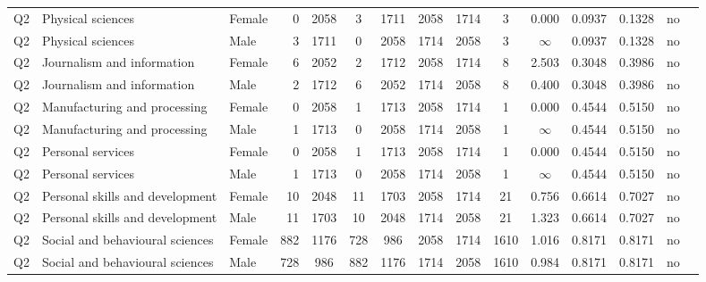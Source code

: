 \begin{longtable}{lllrcccccccccll}
Q2 & Physical sciences & Female & 0 & 2058 & 3 & 1711 & 2058 & 1714 & 3 & 0.000 & 0.0937 & 0.1328 & no \\
Q2 & Physical sciences & Male & 3 & 1711 & 0 & 2058 & 1714 & 2058 & 3 & $\infty$ & 0.0937 & 0.1328 & no \\
Q2 & Journalism and information & Female & 6 & 2052 & 2 & 1712 & 2058 & 1714 & 8 & 2.503 & 0.3048 & 0.3986 & no \\
Q2 & Journalism and information & Male & 2 & 1712 & 6 & 2052 & 1714 & 2058 & 8 & 0.400 & 0.3048 & 0.3986 & no \\
Q2 & Manufacturing and processing & Female & 0 & 2058 & 1 & 1713 & 2058 & 1714 & 1 & 0.000 & 0.4544 & 0.5150 & no \\
Q2 & Manufacturing and processing & Male & 1 & 1713 & 0 & 2058 & 1714 & 2058 & 1 & $\infty$ & 0.4544 & 0.5150 & no \\
Q2 & Personal services & Female & 0 & 2058 & 1 & 1713 & 2058 & 1714 & 1 & 0.000 & 0.4544 & 0.5150 & no \\
Q2 & Personal services & Male & 1 & 1713 & 0 & 2058 & 1714 & 2058 & 1 & $\infty$ & 0.4544 & 0.5150 & no \\
Q2 & Personal skills and development & Female & 10 & 2048 & 11 & 1703 & 2058 & 1714 & 21 & 0.756 & 0.6614 & 0.7027 & no \\
Q2 & Personal skills and development & Male & 11 & 1703 & 10 & 2048 & 1714 & 2058 & 21 & 1.323 & 0.6614 & 0.7027 & no \\
Q2 & Social and behavioural sciences & Female & 882 & 1176 & 728 & 986 & 2058 & 1714 & 1610 & 1.016 & 0.8171 & 0.8171 & no \\
Q2 & Social and behavioural sciences & Male & 728 & 986 & 882 & 1176 & 1714 & 2058 & 1610 & 0.984 & 0.8171 & 0.8171 & no \\
\end{longtable}
